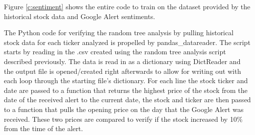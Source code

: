 \documentclass[sigconf]{acmart}
\begin{document}
Figure \ref{c:sentiment} shows the entire code to train on the dataset provided by the historical stock data and Google Alert sentiments.

The Python code for verifying the random tree analysis by pulling historical stock data for each ticker analyzed is propelled by pandas\_datareader. The script starts by reading in the .csv created using the random tree analysis script described previously. The data is read in as a dictionary using DictReader and the output file is opened/created right afterwards to allow for writing out with each loop through the starting file's dictionary. For each line the stock ticker and date are passed to a function that returns the highest price of the stock from the date of the received alert to the current date, the stock and ticker are then passed to a function that pulls the opening price on the day that the Google Alert was received. These two prices are compared to verify if the stock increased by 10\% from the time of the alert. 
\end{document}
